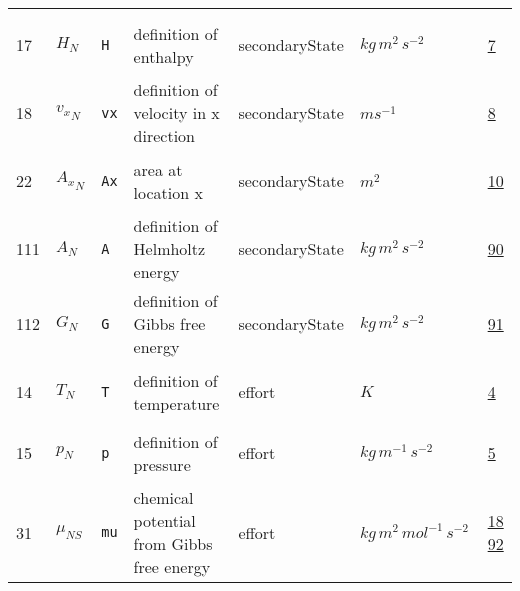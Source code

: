 \begin{longtable}{|p{1cm}|p{3cm}|p{5cm}|p{7.5cm}|p{3.0cm}|p{3cm}|p{1cm}|}
             & \\
    17
             & \hypertarget{"v:17"}{ $ {H}_{N} $}
             & \verb|H|
             & definition of enthalpy
             & \begin{lay}secondaryState \end{lay}
             & $ kg \,m^{2} \,s^{-2} \, $
             & \hyperlink{"e:7"}{ 7 }
                 \\
    18
             & \hypertarget{"v:18"}{ $ {v_{x}}_{N} $}
             & \verb|vx|
             & definition of velocity in x direction
             & \begin{lay}secondaryState \end{lay}
             & $ m s^{-1} \, $
             & \hyperlink{"e:8"}{ 8 }
                 \\
    22
             & \hypertarget{"v:22"}{ $ {A_{x}}_{N} $}
             & \verb|Ax|
             & area at location x
             & \begin{lay}secondaryState \end{lay}
             & $ m^{2} \, $
             & \hyperlink{"e:10"}{ 10 }
                 \\
    111
             & \hypertarget{"v:111"}{ $ {A}_{N} $}
             & \verb|A|
             & definition of Helmholtz energy
             & \begin{lay}secondaryState \end{lay}
             & $ kg \,m^{2} \,s^{-2} \, $
             & \hyperlink{"e:90"}{ 90 }
                 \\
    112
             & \hypertarget{"v:112"}{ $ {G}_{N} $}
             & \verb|G|
             & definition of Gibbs free energy
             & \begin{lay}secondaryState \end{lay}
             & $ kg \,m^{2} \,s^{-2} \, $
             & \hyperlink{"e:91"}{ 91 }
                 \\
    14
             & \hypertarget{"v:14"}{ $ {T}_{N} $}
             & \verb|T|
             & definition of temperature
             & \begin{lay}effort \end{lay}
             & $ K \, $
             & \hyperlink{"e:4"}{ 4 }
                 \\
    15
             & \hypertarget{"v:15"}{ $ {p}_{N} $}
             & \verb|p|
             & definition of pressure
             & \begin{lay}effort \end{lay}
             & $ kg \,m^{-1} \,s^{-2} \, $
             & \hyperlink{"e:5"}{ 5 }
                 \\
    31
             & \hypertarget{"v:31"}{ $ {\mu}_{{N S}} $}
             & \verb|mu|
             & chemical potential from Gibbs free energy
             & \begin{lay}effort \end{lay}
             & $ kg \,m^{2} \,mol^{-1} \,s^{-2} \, $
             & \hyperlink{"e:18"}{ 18 }
                 \hyperlink{"e:92"}{ 92 }
                 \\
    \end{longtable}